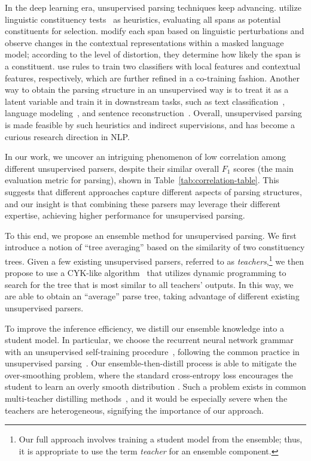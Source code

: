 \documentclass{article}
\begin{document}
In the deep learning era, unsupervised parsing techniques keep advancing. \citet{cao-etal-2020-unsupervised} utilize linguistic constituency tests~\citep{fromkin2003introduction} as heuristics, evaluating all spans as potential constituents for selection. \citet{li-lu-2023-contextual} modify each span based on linguistic perturbations and observe changes in the contextual representations within a masked language model; according to the level of distortion, they determine how likely the span is a constituent. \citet{maveli-cohen-2022-co} use rules to train two classifiers with local features and contextual features, respectively, which are further refined in a co-training fashion. Another way to obtain the parsing structure in an unsupervised way is to treat it as a latent variable and train it in downstream tasks, such as text classification~\citep{li-etal-2019-imitation}, language modeling~\citep{shen2018ordered,kim-etal-2019-unsupervised}, and sentence reconstruction~\citep{drozdov-etal-2019-unsupervised-latent,kim-etal-2019-compound}. Overall, unsupervised parsing is made feasible by such heuristics and indirect supervisions, and has become a curious research direction in NLP.

In our work, we uncover an intriguing phenomenon of low correlation among different unsupervised parsers, despite their similar overall $F_1$ scores (the main evaluation metric for parsing), shown in Table~\ref{tab:correlation-table}. This suggests that different approaches capture different aspects of parsing structures, and our insight is that combining these parsers may leverage their different expertise, achieving higher performance for unsupervised parsing.

To this end, we propose an ensemble method for unsupervised parsing. We first introduce a notion of ``tree averaging'' based on the similarity of two constituency trees. Given a few existing unsupervised parsers, referred to as \textit{teachers},\footnote{Our full approach involves training a student model from the ensemble; thus, it is appropriate to use the term \textit{teacher} for an ensemble component.} we then propose to use a CYK-like algorithm~\citep{Kasami1965AnER,YOUNGER1967189,MANACHER1978127,sennrich-2014-cyk} that utilizes dynamic programming to search for the tree that is most similar to all teachers' outputs. In this way, we are able to obtain an ``average'' parse tree, taking advantage of different existing unsupervised parsers.

To improve the inference efficiency, we distill our ensemble knowledge into a student model. In particular, we choose the recurrent neural network grammar~\citep[RNNG;][]{dyer-etal-2016-recurrent} with an unsupervised self-training procedure~\citep[URNNG;][]{kim-etal-2019-unsupervised}, following the common practice in unsupervised parsing~\citep{kim-etal-2019-compound,cao-etal-2020-unsupervised}. Our ensemble-then-distill process is able to mitigate the over-smoothing problem, where the standard cross-entropy loss encourages the student to learn an overly smooth distribution \citep{wen-etal-2023-f}. Such a problem exists in common multi-teacher distilling methods~\citep{wu-etal-2021-one}, and it would be especially severe when the teachers are heterogeneous, signifying the importance of our approach.
\end{document}
